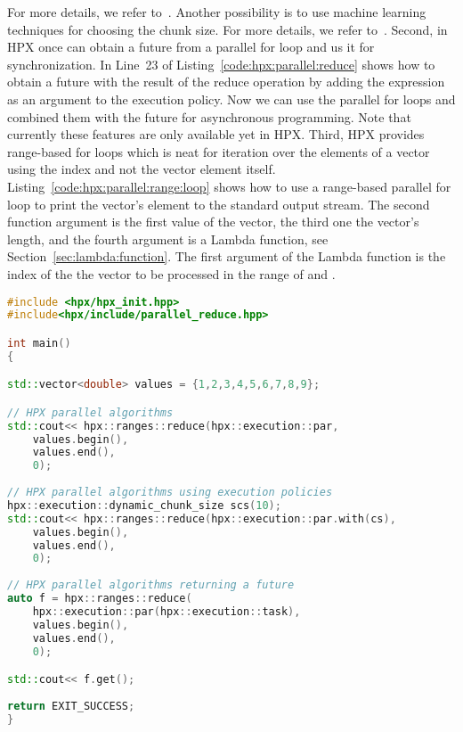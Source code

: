 \vspace{0.25cm}
For more details, we refer to~\cite{grubel2015performance}. Another possibility is to use machine learning techniques for choosing the chunk size. For more details, we refer to~\cite{shirzad2019scheduling}. Second, in HPX once can obtain a future from a parallel for loop and us it for synchronization. In Line~23 of Listing~\ref{code:hpx:parallel:reduce} shows how to obtain a future with the result of the reduce operation by adding the expression  as an argument to the execution policy. Now we can use the parallel for loops and combined them with the future for asynchronous programming. Note that currently these features are only available yet in HPX. Third, HPX provides range-based for loops which is neat for iteration over the elements of a vector using the index and not the vector element itself. Listing~\ref{code:hpx:parallel:range:loop} shows how to use a range-based parallel for loop to print the vector's element to the standard output stream.  The second function argument is the first value of the vector, the third one the vector's length, and the fourth argument is a Lambda function, see Section~\ref{sec:lambda:function}. The first argument of the Lambda function is the index of the the vector to be processed in the range of  and .


\begin{lstlisting}[language=c++,caption={Parallel algorithms (reduce) using HPX.\label{code:hpx:parallel:reduce}},float,floatplacement=tb]
#include <hpx/hpx_init.hpp>
#include<hpx/include/parallel_reduce.hpp>

int main()
{

std::vector<double> values = {1,2,3,4,5,6,7,8,9};

// HPX parallel algorithms
std::cout<< hpx::ranges::reduce(hpx::execution::par,
	values.begin(),
	values.end(),
	0);
	
// HPX parallel algorithms using execution policies
hpx::execution::dynamic_chunk_size scs(10);
std::cout<< hpx::ranges::reduce(hpx::execution::par.with(cs),
	values.begin(),
	values.end(),
	0);
	
// HPX parallel algorithms returning a future
auto f = hpx::ranges::reduce(
	hpx::execution::par(hpx::execution::task),
	values.begin(),
	values.end(),
	0);

std::cout<< f.get();
  
return EXIT_SUCCESS;
}

\end{lstlisting}

